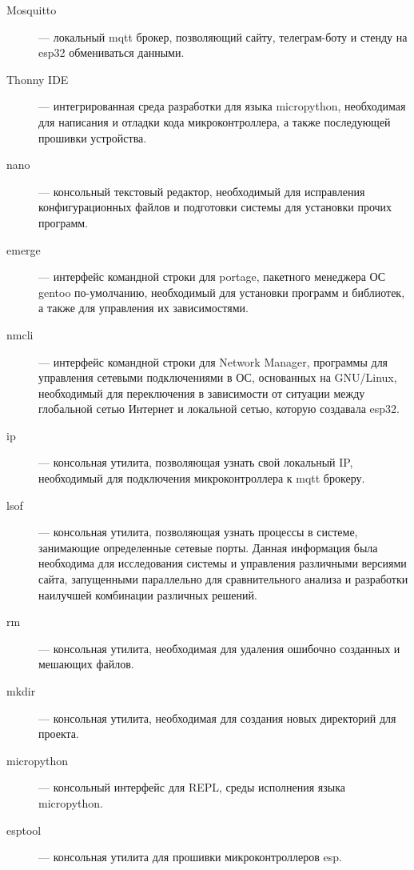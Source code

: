\begin{description}
	\item[Mosquitto] — локальный mqtt брокер, позволяющий сайту, телеграм-боту и стенду на esp32 обмениваться данными.
	\item[Thonny IDE] — интегрированная среда разработки для языка micropython, необходимая для написания и отладки кода микроконтроллера, а также последующей прошивки устройства.
	\item[nano] — консольный текстовый редактор, необходимый для исправления конфигурационных файлов и подготовки системы для установки прочих программ.
	\item[emerge] — интерфейс командной строки для portage, пакетного менеджера ОС gentoo по-умолчанию, необходимый для установки программ и библиотек, а также для управления их зависимостями.
	\item[nmcli] —  интерфейс командной строки для Network Manager, программы для управления сетевыми подключениями в ОС, основанных на GNU/Linux, необходимый для переключения в зависимости от ситуации между глобальной сетью Интернет и локальной сетью, которую создавала esp32.
	\item[ip] — консольная утилита, позволяющая узнать свой локальный IP, необходимый для подключения микроконтроллера к mqtt брокеру.
	\item[lsof] — консольная утилита, позволяющая узнать процессы в системе, занимающие определенные сетевые порты. Данная информация была необходима для исследования системы и управления различными версиями сайта, запущенными параллельно для сравнительного анализа и разработки наилучшей комбинации различных решений.
	\item[rm] — консольная утилита, необходимая для удаления ошибочно созданных и мешающих файлов.
	\item[mkdir] —  консольная утилита, необходимая для создания новых директорий для проекта.
	\item[micropython] — консольный интерфейс для REPL, среды исполнения языка micropython.
	\item[esptool] —  консольная утилита для прошивки микроконтроллеров esp.
\end{description}

